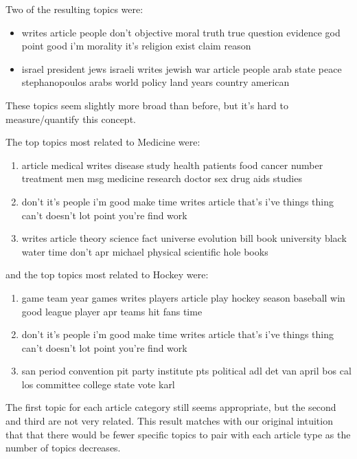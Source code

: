 Two of the resulting topics were:
\begin{itemize}
	\item writes article people don't objective moral truth true question evidence god point good i'm morality it's religion exist claim reason
	\item israel president jews israeli writes jewish war article people arab state peace stephanopoulos arabs world policy land years country american
\end{itemize}
These topics seem slightly more broad than before, but it's hard to measure/quantify this concept.

The top topics most related to Medicine were:
\begin{enumerate}
	\item article medical writes disease study health patients food cancer number treatment men msg medicine research doctor sex drug aids studies
	\item don't it's people i'm good make time writes article that's i've things thing can't doesn't lot point you're find work
	\item writes article theory science fact universe evolution bill book university black water time don't apr michael physical scientific hole books
\end{enumerate}
and the top topics most related to Hockey were:
\begin{enumerate}
	\item game team year games writes players article play hockey season baseball win good league player apr teams hit fans time
	\item don't it's people i'm good make time writes article that's i've things thing can't doesn't lot point you're find work
	\item san period convention pit party institute pts political adl det van april bos cal los committee college state vote karl 
\end{enumerate}
The first topic for each article category still seems appropriate, but the second and third are not very related.
This result matches with our original intuition that that there would be fewer specific topics to pair with each article type as the number of topics decreases.